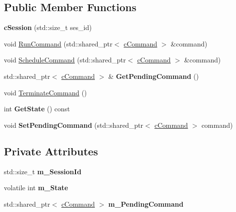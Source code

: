 \subsection*{Public Member Functions}
\begin{DoxyCompactItemize}
\item 
\hypertarget{classengine_1_1cSession_ac84db9690073b0d7cd90b000b8c0e898}{{\bfseries c\-Session} (std\-::size\-\_\-t ses\-\_\-id)}\label{classengine_1_1cSession_ac84db9690073b0d7cd90b000b8c0e898}

\item 
void \hyperlink{classengine_1_1cSession_a35303640de423b2a94885d9f96c90f71}{Run\-Command} (std\-::shared\-\_\-ptr$<$ \hyperlink{classengine_1_1cCommand}{c\-Command} $>$ \&command)
\item 
void \hyperlink{classengine_1_1cSession_afe7cc1ff5b08117cc90d574e519bb08c}{Schedule\-Command} (std\-::shared\-\_\-ptr$<$ \hyperlink{classengine_1_1cCommand}{c\-Command} $>$ \&command)
\item 
\hypertarget{classengine_1_1cSession_a7827997872b114c09f4582a7ffcadb47}{std\-::shared\-\_\-ptr$<$ \hyperlink{classengine_1_1cCommand}{c\-Command} $>$ \& {\bfseries Get\-Pending\-Command} ()}\label{classengine_1_1cSession_a7827997872b114c09f4582a7ffcadb47}

\item 
void \hyperlink{classengine_1_1cSession_af1a1747cd7020bd4bfce782bf1ffec5d}{Terminate\-Command} ()
\item 
\hypertarget{classengine_1_1cSession_a4d5cfbd1a1a5d1ff022fd4915b256f4f}{int {\bfseries Get\-State} () const }\label{classengine_1_1cSession_a4d5cfbd1a1a5d1ff022fd4915b256f4f}

\item 
\hypertarget{classengine_1_1cSession_a922b139a6b22a63463403874e114ea1d}{void {\bfseries Set\-Pending\-Command} (std\-::shared\-\_\-ptr$<$ \hyperlink{classengine_1_1cCommand}{c\-Command} $>$ command)}\label{classengine_1_1cSession_a922b139a6b22a63463403874e114ea1d}

\end{DoxyCompactItemize}
\subsection*{Private Attributes}
\begin{DoxyCompactItemize}
\item 
\hypertarget{classengine_1_1cSession_af7dc53c09799a31677b47a66ca5121ce}{std\-::size\-\_\-t {\bfseries m\-\_\-\-Session\-Id}}\label{classengine_1_1cSession_af7dc53c09799a31677b47a66ca5121ce}

\item 
\hypertarget{classengine_1_1cSession_af0edf0e0ced62ee7e8a5136637cc0084}{volatile int {\bfseries m\-\_\-\-State}}\label{classengine_1_1cSession_af0edf0e0ced62ee7e8a5136637cc0084}

\item 
\hypertarget{classengine_1_1cSession_ad880aa614d581b5155e75c22c775659b}{std\-::shared\-\_\-ptr$<$ \hyperlink{classengine_1_1cCommand}{c\-Command} $>$ {\bfseries m\-\_\-\-Pending\-Command}}\label{classengine_1_1cSession_ad880aa614d581b5155e75c22c775659b}

\end{DoxyCompactItemize}

